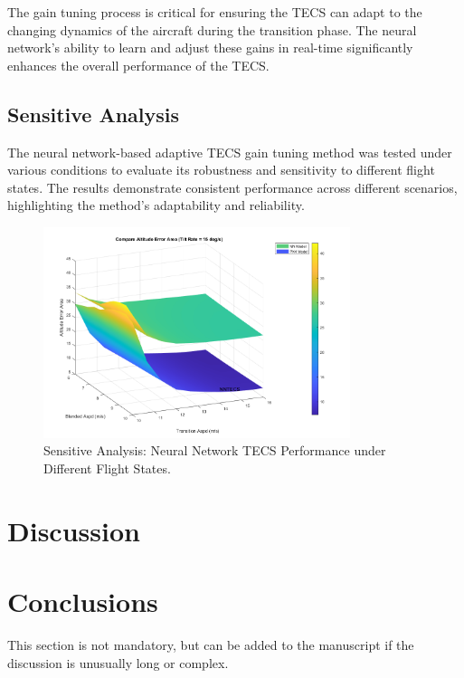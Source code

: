 \documentclass[journal,article,submit,pdftex,moreauthors]{Definitions/mdpi}
\begin{document}
The gain tuning process is critical for ensuring the TECS can adapt to the changing dynamics of the aircraft during the transition phase. The neural network's ability to learn and adjust these gains in real-time significantly enhances the overall performance of the TECS.

\subsection{Sensitive Analysis}
The neural network-based adaptive TECS gain tuning method was tested under various conditions to evaluate its robustness and sensitivity to different flight states. The results demonstrate consistent performance across different scenarios, highlighting the method's adaptability and reliability.

\begin{figure}[H]
    \centering
    \includegraphics[width=0.8\textwidth]{sensitive_analysis.png}
    \caption{Sensitive Analysis: Neural Network TECS Performance under Different Flight States.}
    \label{fig:sensitive_analysis}
\end{figure}

\section{Discussion}



\section{Conclusions}

This section is not mandatory, but can be added to the manuscript if the discussion is unusually long or complex.
\end{document}
